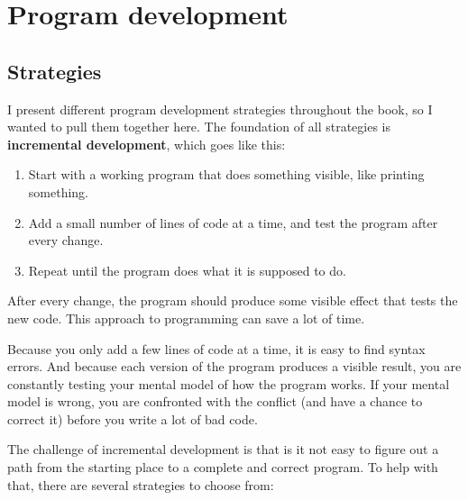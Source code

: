 \chapter{Program development}
\label{development}

\section{Strategies}

I present different program development strategies throughout
the book, so I wanted to pull them together here.
%
The foundation of all strategies is {\bf incremental development},
which goes like this:

\begin{enumerate}

\item Start with a working program that does something visible,
   like printing something.

\item Add a small number of lines of code at a time,
   and test the program after every change.

\item Repeat until the program does what it is supposed to do.

\end{enumerate}

After every change, the program should produce some visible effect
that tests the new code.  This approach to programming can save
a lot of time.

Because you only add a few lines of code at a time, it
is easy to find syntax errors.
%
And because each version of the
program produces a visible result, you are constantly testing your
mental model of how the program works.  If your mental model is
wrong, you are confronted with the conflict (and have a chance
to correct it) before you write a lot of bad code.

The challenge of incremental development is that is it not
easy to figure out a path from the starting place
to a complete and correct program.
%
To help with that, there are several strategies to choose from:

